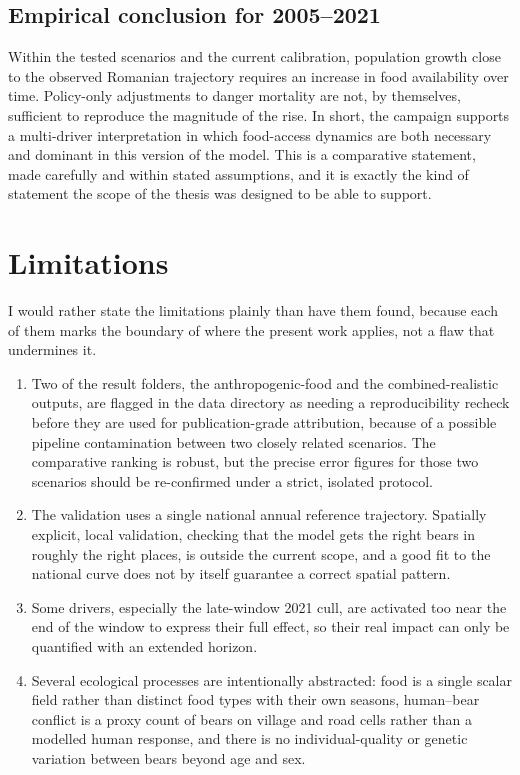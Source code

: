 \subsection*{Empirical conclusion for 2005--2021}

Within the tested scenarios and the current calibration, population growth close to the observed Romanian trajectory requires an increase in food availability over time. Policy-only adjustments to danger mortality are not, by themselves, sufficient to reproduce the magnitude of the rise. In short, the campaign supports a multi-driver interpretation in which food-access dynamics are both necessary and dominant in this version of the model. This is a comparative statement, made carefully and within stated assumptions, and it is exactly the kind of statement the scope of the thesis was designed to be able to support.

\section{Limitations}

I would rather state the limitations plainly than have them found, because each of them marks the boundary of where the present work applies, not a flaw that undermines it.

\begin{enumerate}
    \item Two of the result folders, the anthropogenic-food and the combined-realistic outputs, are flagged in the data directory as needing a reproducibility recheck before they are used for publication-grade attribution, because of a possible pipeline contamination between two closely related scenarios. The comparative ranking is robust, but the precise error figures for those two scenarios should be re-confirmed under a strict, isolated protocol.
    \item The validation uses a single national annual reference trajectory. Spatially explicit, local validation, checking that the model gets the right bears in roughly the right places, is outside the current scope, and a good fit to the national curve does not by itself guarantee a correct spatial pattern.
    \item Some drivers, especially the late-window 2021 cull, are activated too near the end of the window to express their full effect, so their real impact can only be quantified with an extended horizon.
    \item Several ecological processes are intentionally abstracted: food is a single scalar field rather than distinct food types with their own seasons, human--bear conflict is a proxy count of bears on village and road cells rather than a modelled human response, and there is no individual-quality or genetic variation between bears beyond age and sex.
\end{enumerate}

